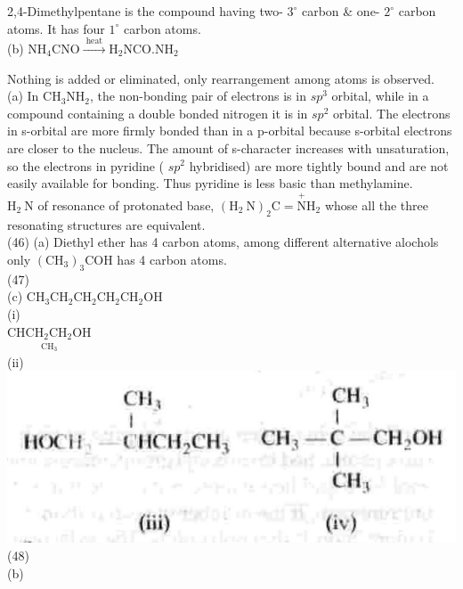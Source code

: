 \documentclass[10pt]{article}
\begin{document}
2,4-Dimethylpentane is the compound having two- $3^{\circ}$ carbon \& one- $2^{\circ}$ carbon atoms. It has four $1^{\circ}$ carbon atoms.\\
(b) $\mathrm{NH}_{4} \mathrm{CNO} \xrightarrow{\text { heat }} \mathrm{H}_{2} \mathrm{NCO} . \mathrm{NH}_{2}$

Nothing is added or eliminated, only rearrangement among atoms is observed.\\
(a) In $\mathrm{CH}_{3} \mathrm{NH}_{2}$, the non-bonding pair of electrons is in $s p^{3}$ orbital, while in a compound containing a double bonded nitrogen it is in $s p^{2}$ orbital. The electrons in s-orbital are more firmly bonded than in a p-orbital because s-orbital electrons are closer to the nucleus. The amount of s-character increases with unsaturation, so the electrons in pyridine ( $s p^{2}$ hybridised) are more tightly bound and are not easily available for bonding. Thus pyridine is less basic than methylamine.\\
$\mathrm{H}_{2} \mathrm{~N}$ of resonance of protonated base, $\left(\mathrm{H}_{2} \mathrm{~N}\right)_{2} \mathrm{C}=\stackrel{+}{\mathrm{N}} \mathrm{H}_{2}$ whose all the three resonating structures are equivalent.\\
(46) (a) Diethyl ether has 4 carbon atoms, among different alternative alochols only $\left(\mathrm{CH}_{3}\right)_{3} \mathrm{COH}$ has 4 carbon atoms.\\
(47)\\
(c) $\mathrm{CH}_{3} \mathrm{CH}_{2} \mathrm{CH}_{2} \mathrm{CH}_{2} \mathrm{CH}_{2} \mathrm{OH}$\\
(i)\\
$\underset{\substack{\mathrm{CH}_{3}}}{\mathrm{CHCH}_{2} \mathrm{CH}_{2} \mathrm{OH}}$\\
(ii)\\
\includegraphics[max width=\textwidth, center]{2025_01_28_8470952b98110cec3aabg-158(1)}\\
(48)\\
(b)\\
\end{document}
